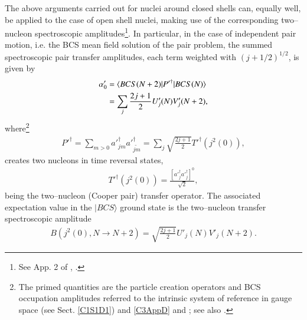 The above arguments carried out for nuclei around closed shells can,  equally well, be applied to the case of open shell nuclei, making use of the corresponding two--nucleon spectroscopic amplitudes\footnote{See App. 2 of \cite{Broglia:73}, \cite{Yoshida:62}.}.
In particular, in the case of independent pair motion, i.e. the BCS mean field solution of the pair problem, the summed spectroscopic pair transfer amplitudes, each term weighted with $(j+1/2)^{1/2}$, is given by
\begin{align}\label{eq1.2.14}
\nonumber \alpha_0'&=\langle {BCS(N+2)|P'^\dagger|BCS(N)} \rangle\\
&=\sum_{j}\frac{2j+1}{2}U'_j(N)V'_j(N+2),
\end{align}
where\footnote{The primed quantities are the particle creation operators and BCS occupation amplitudes referred to the intrinsic system of reference in gauge space (see Sect. \ref{C1S1D1}) and \ref{C3AppD} and \cite{Potel:17}; see also \cite{Potel:13b}.}
\begin{align}\label{eq1.2.15}
P'^\dagger=\sum_{m>0}a'^\dagger_{jm}a'^\dagger_{\widetilde{jm}}=\sum_j\sqrt{\frac{2j+1}{2}}T'^{\dagger}(j^2(0)),
\end{align}
creates two nucleons in time reversal states, 
\begin{align}\label{eq1.2.16}
T'^{\dagger}(j^2(0))=\frac{\left[a'^\dagger_ja'^\dagger_j\right]^0}{\sqrt{2}},
\end{align}
being the two--nucleon (Cooper pair) transfer operator. The associated expectation value in the $|BCS\rangle$ ground state is the two--nucleon transfer spectroscopic amplitude  
\begin{align}\label{eq1.2.17}
B(j^2(0),N\to N+2)=\sqrt{\frac{2j+1}{2}}U'_j(N)V'_j(N+2).
\end{align}
